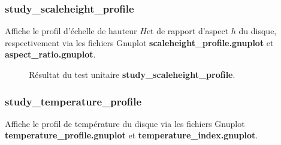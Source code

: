 \subsubsection{study\_scaleheight\_profile}
Affiche le profil d'échelle de hauteur $H$et de rapport d'aspect $h$ du disque, respectivement via les fichiers Gnuplot \textbf{scaleheight\_profile.gnuplot} et \textbf{aspect\_ratio.gnuplot}.

\begin{figure}[htbp]
\centering
{}\hfill
{}\hfill
\caption{Résultat du test unitaire \textbf{study\_scaleheight\_profile}.}
\end{figure}

\subsubsection{study\_temperature\_profile}
Affiche le profil de température du disque via les fichiers Gnuplot \textbf{temperature\_profile.gnuplot} et \textbf{temperature\_index.gnuplot}.

